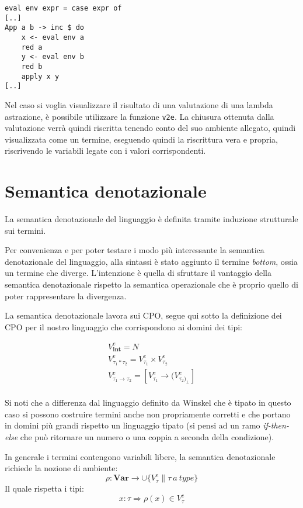 \documentclass{article}
\begin{document}
\begin{verbatim}
eval env expr = case expr of
[..]
App a b -> inc $ do
    x <- eval env a
    red a
    y <- eval env b
    red b
    apply x y
[..]
\end{verbatim}

Nel caso si voglia visualizzare il risultato di una valutazione di una lambda astrazione, è possibile utilizzare la funzione  \texttt{v2e}. La chiusura ottenuta dalla valutazione verrà quindi riscritta tenendo conto del suo ambiente allegato, quindi visualizzata come un termine, eseguendo quindi la riscrittura vera e propria, riscrivendo le variabili legate con i valori corrispondenti.



\section{Semantica denotazionale}
\label{sec:denotational}
La semantica denotazionale del linguaggio è definita tramite induzione strutturale sui termini.

Per convenienza e per poter testare i modo più interessante la semantica denotazionale del linguaggio, alla sintassi è stato aggiunto il termine \emph{bottom}, ossia un termine che diverge. L'intenzione è quella di sfruttare il vantaggio della semantica denotazionale rispetto la semantica operazionale che è proprio quello di poter rappresentare la divergenza.

La semantica denotazionale lavora sui CPO, segue qui sotto la definizione dei CPO per il nostro linguaggio che corrispondono ai domini dei tipi:

\begin{gather*}
V^{e}_{\mathbf{int}} = N
\\
V^{e}_{\tau_{1} * \tau_{2}} = V^{e}_{\tau_{1}} \times V^{e}_{\tau_{2}}
\\
V^{e}_{\tau_{1} \rightarrow \tau_{2}} = [V^{e}_{\tau_{1}} \rightarrow (V^{e}_{\tau_{2})_{\perp}}]
\\
\end{gather*}

Si noti che a differenza dal linguaggio definito da Winskel che è tipato in questo caso si possono costruire termini anche non propriamente corretti e che portano in domini più grandi rispetto un linguaggio tipato (si pensi ad un ramo \emph{if-then-else} che può ritornare un numero o una coppia a seconda della condizione).

In generale i termini contengono variabili libere, la semantica denotazionale richiede la nozione di ambiente:
$$
\rho : \mathbf{Var} \rightarrow \cup \{ V^{e}_\tau \| \tau \ a \ type \}
$$
Il quale rispetta i tipi:
$$
x : \tau \Rightarrow \rho ( x ) \in V^{e}_{\tau}
$$
\end{document}
